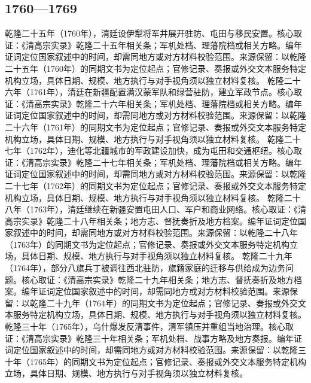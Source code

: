 \subsection{1760—1769}
乾隆二十五年（1760年），清廷设伊犁将军并展开驻防、屯田与移民安置。核心取证：《清高宗实录》乾隆二十五年相关条；军机处档、理藩院档或相关方略。编年证词定位国家叙述中的时间，却需同地方或对方材料校验范围。来源保留：以乾隆二十五年（1760年）的同期文书为定位起点；官修记录、奏报或外交文本服务特定机构立场，具体日期、规模、地方执行与对手视角须以独立材料复核。
乾隆二十六年（1761年），清廷在新疆配置满汉蒙军队和绿营驻防，建立军政节点。核心取证：《清高宗实录》乾隆二十六年相关条；军机处档、理藩院档或相关方略。编年证词定位国家叙述中的时间，却需同地方或对方材料校验范围。来源保留：以乾隆二十六年（1761年）的同期文书为定位起点；官修记录、奏报或外交文本服务特定机构立场，具体日期、规模、地方执行与对手视角须以独立材料复核。
乾隆二十七年（1762年），迪化等北疆城市的军政建设加快，成为屯田和交通枢纽。核心取证：《清高宗实录》乾隆二十七年相关条；军机处档、理藩院档或相关方略。编年证词定位国家叙述中的时间，却需同地方或对方材料校验范围。来源保留：以乾隆二十七年（1762年）的同期文书为定位起点；官修记录、奏报或外交文本服务特定机构立场，具体日期、规模、地方执行与对手视角须以独立材料复核。
乾隆二十八年（1763年），清廷继续在新疆安置屯田人口、军户和商业网络。核心取证：《清高宗实录》乾隆二十八年相关条；地方志、督抚奏折及地方档案。编年证词定位国家叙述中的时间，却需同地方或对方材料校验范围。来源保留：以乾隆二十八年（1763年）的同期文书为定位起点；官修记录、奏报或外交文本服务特定机构立场，具体日期、规模、地方执行与对手视角须以独立材料复核。
乾隆二十九年（1764年），部分八旗兵丁被调往西北驻防，旗籍家庭的迁移与供给成为边务问题。核心取证：《清高宗实录》乾隆二十九年相关条；地方志、督抚奏折及地方档案。编年证词定位国家叙述中的时间，却需同地方或对方材料校验范围。来源保留：以乾隆二十九年（1764年）的同期文书为定位起点；官修记录、奏报或外交文本服务特定机构立场，具体日期、规模、地方执行与对手视角须以独立材料复核。
乾隆三十年（1765年），乌什爆发反清事件，清军镇压并重组当地治理。核心取证：《清高宗实录》乾隆三十年相关条；军机处档、战事方略及地方奏报。编年证词定位国家叙述中的时间，却需同地方或对方材料校验范围。来源保留：以乾隆三十年（1765年）的同期文书为定位起点；官修记录、奏报或外交文本服务特定机构立场，具体日期、规模、地方执行与对手视角须以独立材料复核。
